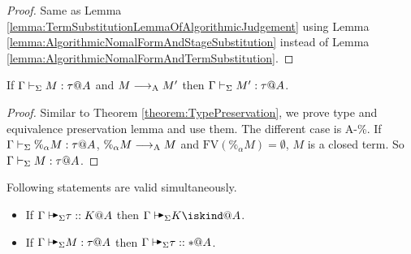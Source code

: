 \begin{proof}
    Same as Lemma \ref{lemma:TermSubstitutionLemmaOfAlgorithmicJudgement} using
    Lemma \ref{lemma:AlgorithmicNomalFormAndStageSubstitution} instead of Lemma
    \ref{lemma:AlgorithmicNomalFormAndTermSubstitution}.
\end{proof}

\begin{lemma}
    \label{lemma:TypePreservationofAlgorithmicReduction}
    If \( \Gamma \vdash_\Sigma M:\tau @A \) and \( M \longrightarrow_{\text{A}} M' \) then \( \Gamma \vdash_\Sigma M' : \tau @ A \).
\end{lemma}


\begin{proof}
    Similar to Theorem \ref{theorem:TypePreservation}, we prove type and
    equivalence preservation lemma and use them. The different case is
    \textsc{A-\%}.  If \( \Gamma \vdash_\Sigma \%_\alpha M : \tau @ A \), \( \%_\alpha M \longrightarrow_{\text{A}} M
    \) and \( \text{FV}(\%_\alpha M) = \emptyset \), \( M \) is a closed term.
    So \( \Gamma \vdash_\Sigma M : \tau @ A \).
\end{proof}

%

\begin{lemma}
    Following statements are valid simultaneously.
    \label{lemma:AgreementofAlgorithmicTyping}
    \begin{itemize}
        \item If \( \G \AVS \tau :: K @ A \) then \( \G \AVS K \iskind@ A \).
        \item If \( \G \AVS M : \tau @ A \) then \( \G \AVS \tau :: * @ A \).
    \end{itemize}
\end{lemma}

